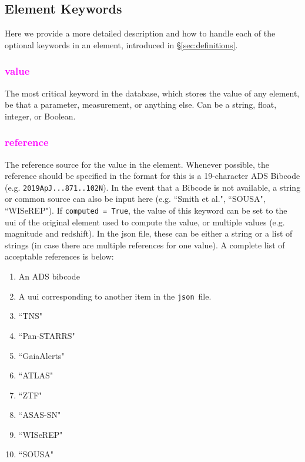 \documentclass[tighten]{aastex631}
\newcommand{\json}{{\tt json}}
\newcommand{\keyword}[1]{\textcolor{magenta}{#1}}
\begin{document}
\subsection{Element Keywords} \label{sec:elements}

Here we provide a more detailed description and how to handle each of the optional keywords in an element, introduced in \S\ref{sec:definitions}.

\subsubsection{\keyword{value}} \label{subsec:value}

The most critical keyword in the database, which stores the value of any element, be that a parameter, measurement, or anything else. Can be a string, float, integer, or Boolean.

\subsubsection{\keyword{reference}} \label{subsec:reference}

The reference source for the value in the element. Whenever possible, the reference should be specified in the format for this is a 19-character ADS Bibcode (e.g. {\tt 2019ApJ...871..102N}). In the event that a Bibcode is not available, a string or common source can also be input here (e.g. ``Smith et al.", ``SOUSA", ``WISeREP"). If {\tt computed = True}, the value of this keyword can be set to the uui of the original element used to compute the value, or multiple values (e.g. magnitude and redshift). In the json file, these can be either a string or a list of strings (in case there are multiple references for one value). A complete list of acceptable references is below:
\begin{enumerate}
    \item An ADS bibcode
    \item A uui corresponding to another item in the \json\ file.
    \item ``TNS"
    \item ``Pan-STARRS"
    \item ``GaiaAlerts"
    \item ``ATLAS"
    \item ``ZTF"
    \item ``ASAS-SN"
    \item ``WISeREP"
    \item ``SOUSA"
\end{enumerate}
\end{document}

